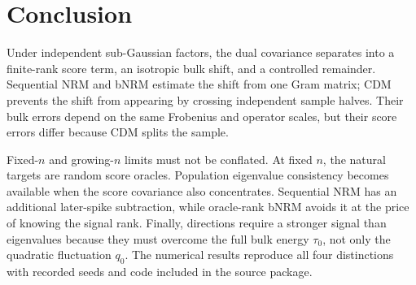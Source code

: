 \section{Conclusion}\label{sec:conclusion}
Under independent sub-Gaussian factors, the dual covariance separates into a finite-rank score term, an isotropic bulk shift, and a controlled remainder.  Sequential NRM and bNRM estimate the shift from one Gram matrix; CDM prevents the shift from appearing by crossing independent sample halves.  Their bulk errors depend on the same Frobenius and operator scales, but their score errors differ because CDM splits the sample.

Fixed-$n$ and growing-$n$ limits must not be conflated.  At fixed $n$, the natural targets are random score oracles.  Population eigenvalue consistency becomes available when the score covariance also concentrates.  Sequential NRM has an additional later-spike subtraction, while oracle-rank bNRM avoids it at the price of knowing the signal rank.  Finally, directions require a stronger signal than eigenvalues because they must overcome the full bulk energy $\tau_0$, not only the quadratic fluctuation $q_0$.  The numerical results reproduce all four distinctions with recorded seeds and code included in the source package.
